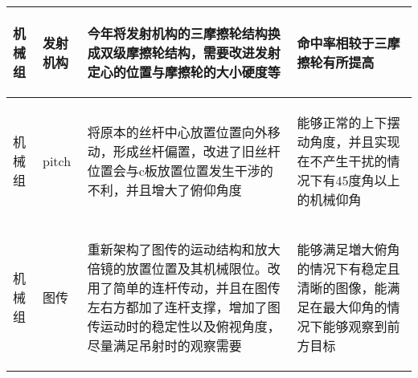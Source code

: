 \begin{longtable}{ p{1.5cm} | p{3cm} | p{6cm} | p{4.3cm} |}
    \hline

        \begin{center}
            机械组
        \end{center}&
        \begin{center}
            发射机构
        \end{center}&
        \begin{center}
            今年将发射机构的三摩擦轮结构换成双级摩擦轮结构，需要改进发射定心的位置与摩擦轮的大小硬度等
        \end{center}&
        \begin{center}
            命中率相较于三摩擦轮有所提高
        \end{center}\\
        
    \hline
    
        \begin{center}
            机械组
        \end{center} &
        \begin{center}
            pitch
        \end{center} &
        \begin{center}
            将原本的丝杆中心放置位置向外移动，形成丝杆偏置，改进了旧丝杆位置会与c板放置位置发生干涉的不利，并且增大了俯仰角度
        \end{center} &
        \begin{center}
            能够正常的上下摆动角度，并且实现在不产生干扰的情况下有45度角以上的机械仰角
        \end{center} \\

    \hline
    
        \begin{center}
            机械组
        \end{center} &
        \begin{center}
            图传
        \end{center} &
        \begin{center}
            重新架构了图传的运动结构和放大倍镜的放置位置及其机械限位。改用了简单的连杆传动，并且在图传左右方都加了连杆支撑，增加了图传运动时的稳定性以及俯视角度，尽量满足吊射时的观察需要
        \end{center} &
        \begin{center}
            能够满足増大俯角的情况下有稳定且清晰的图像，能满足在最大仰角的情况下能够观察到前方目标
        \end{center} \\


\end{longtable}
